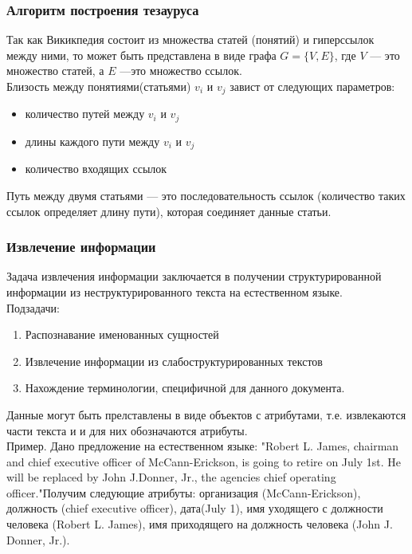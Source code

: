 \documentclass{beamer}
\begin{document}
\begin{frame}
\frametitle{Алгоритм построения тезауруса}
Так как Викикпедия состоит из множества статей (понятий) и гиперссылок между ними, то может быть представлена
в виде графа $G = \{V,E\}$, где $V$  --- это множество статей, а $E$ ---это множество ссылок.\\
Близость между понятиями(статьями) $v_i$ и $v_j$ завист от следующих параметров:

\vspace{1cm}

\begin{itemize}
\item{количество путей между $v_i$ и $v_j$}
\item{длины каждого пути между $v_i$ и $v_j$}
\item{количество входящих ссылок}
\end{itemize}

\vspace{1cm}
Путь между двумя статьями — это последовательность ссылок (количество таких ссылок определяет длину пути), которая соединяет данные статьи.\\

\end{frame}

\begin{frame}
\frametitle{Извлечение информации}
Задача извлечения информации заключается в получении структурированной информации из
неструктурированного текста на естественном языке.\\

\vspace{1cm}
Подзадачи:
\begin{enumerate}
\item{Распознавание именованных сущностей}
\item{Извлечение информации из слабоструктурированных текстов}
\item{Нахождение терминологии, специфичной для данного документа.}
\end{enumerate}


\vspace{1cm}

Данные могут быть прелставлены в виде объектов с атрибутами, т.е. извлекаются 
части текста и и для них обозначаются атрибуты.\\

\vspace{1cm}
Пример. Дано предложение на естественном языке: "Robert L. James, chairman and chief executive
officer of McCann-Erickson, is going to retire on July 1st. He will be replaced
by John J.Donner, Jr., the agencies chief operating officer."Получим следующие
атрибуты: организация (McCann-Erickson), должность (chief executive officer),
дата(July 1), имя уходящего с должности человека (Robert L. James), имя
приходящего на должность человека (John J. Donner, Jr.).

\end{frame}
\end{document}
